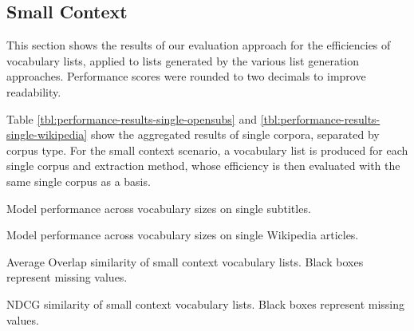 \subsection{Small Context} \label{sec:results-small-context}
This section shows the results of our evaluation approach for the efficiencies of vocabulary lists, applied to lists generated by the various list generation approaches.
Performance scores were rounded to two decimals to improve readability.

Table \ref{tbl:performance-results-single-opensubs} and \ref{tbl:performance-results-single-wikipedia} show the aggregated results of single corpora, separated by corpus type.
For the small context scenario, a vocabulary list is produced for each single corpus and extraction method, whose efficiency is then evaluated with the same single corpus as a basis.
%
% 	


\begin{table}[H]
	\centering
	\resizebox{\textwidth}{!}{%
		
	}
	\caption{Model performance across vocabulary sizes on single subtitles.}
	\label{tbl:performance-results-single-opensubs}
\end{table}

\begin{table}[H]
	\centering
	\resizebox{\textwidth}{!}{%
		
	}
	\caption{Model performance across vocabulary sizes on single Wikipedia articles.}
	\label{tbl:performance-results-single-wikipedia}
\end{table}

\begin{table}[H]
	\centering
	\resizebox{\textwidth}{!}{%
		
	}
	\caption{Average Overlap similarity of small context vocabulary lists. Black boxes represent missing values.}
	\label{tbl:similarity-results-single-average-overlap}
\end{table}

\begin{table}[H]
	\centering
	\resizebox{\textwidth}{!}{%
		
	}
	\caption{NDCG similarity of small context vocabulary lists. Black boxes represent missing values.}
	\label{tbl:similarity-results-single-ndcg}
\end{table}





